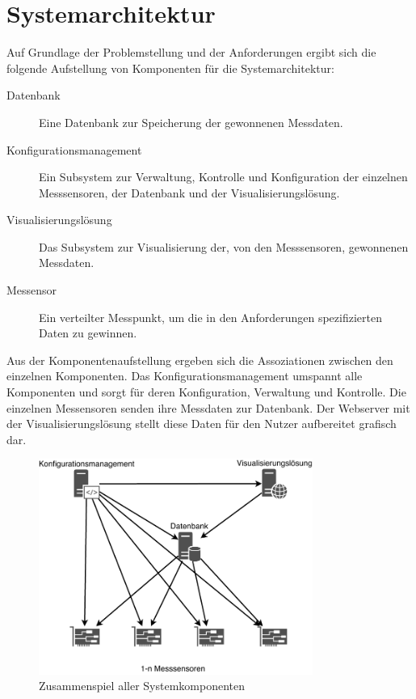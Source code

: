 \documentclass[titlepage]{report}
\begin{document}
\section*{Systemarchitektur}
Auf Grundlage der Problemstellung und der Anforderungen ergibt sich die
folgende Aufstellung von Komponenten für die Systemarchitektur:
\begin{description}
    \item[Datenbank] Eine Datenbank zur Speicherung der
                     gewonnenen Messdaten.
    \item[Konfigurationsmanagement] Ein Subsystem zur Verwaltung, Kontrolle
        und Konfiguration der einzelnen Messsensoren, der Datenbank und
        der Visualisierungslösung.
    \item[Visualisierungslösung] Das Subsystem zur Visualisierung der, von
        den Messsensoren, gewonnenen Messdaten.
    \item[Messensor] Ein verteilter Messpunkt, um die in den
        Anforderungen spezifizierten Daten zu gewinnen.
\end{description}
Aus der Komponentenaufstellung ergeben sich die Assoziationen zwischen
den einzelnen Komponenten. Das Konfigurationsmanagement umspannt alle
Komponenten und sorgt für deren Konfiguration, Verwaltung und Kontrolle.
Die einzelnen Messensoren senden ihre Messdaten zur Datenbank. Der
Webserver mit der Visualisierungslösung stellt diese Daten für den Nutzer aufbereitet
 grafisch dar.
\begin{figure}[H]
    \centering
    \includegraphics[width=0.8\textwidth]{figures/network.pdf}
    \caption{Zusammenspiel aller Systemkomponenten}\label{fig:network}
\end{figure}
\end{document}
